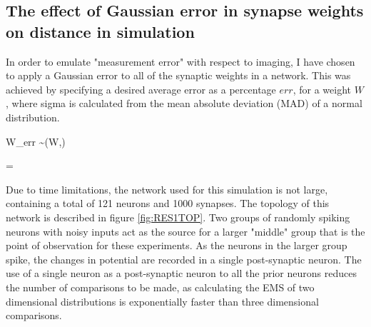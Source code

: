 \subsection{The effect of Gaussian error in synapse weights on distance in simulation}
\label{TheeffectofGaussianerror}

In order to emulate "measurement error" with respect to imaging, I have chosen
to apply a Gaussian error to all of the synaptic weights in a network. This was
achieved by specifying a desired average error as a percentage $err$, for a
weight $W$, where sigma is calculated from the mean absolute deviation (MAD) of
a normal distribution.

\begin{myequation}
    W_{err} \sim {}(W,\sigma)
\end{myequation}
\begin{myequation}
    \sigma = 
\end{myequation}

Due to time limitations, the network used for this simulation is not large,
containing a total of 121 neurons and 1000 synapses. The topology of this
network is described in figure \ref{fig:RES1TOP}. Two groups of randomly spiking
neurons with noisy inputs act as the source for a larger "middle" group that is
the point of observation for these experiments. As the neurons in the larger
group spike, the changes in potential are recorded in a single post-synaptic
neuron. The use of a single neuron as a post-synaptic neuron to all the prior
neurons reduces the number of comparisons to be made, as calculating the EMS of
two dimensional distributions is exponentially faster than three dimensional
comparisons. 

